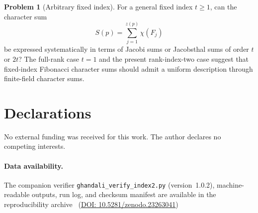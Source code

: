 \documentclass[11pt]{amsart}
\theoremstyle{plain}
\theoremstyle{definition}
\newtheorem{problem}[theorem]{Problem}
\begin{document}
\begin{problem}[Arbitrary fixed index]\label{prob:arbitrary-index}
For a general fixed index \(t\ge1\), can the character sum
\[
  S(p)=\sum_{j=1}^{z(p)}\chi(F_j)
\]
be expressed systematically in terms of Jacobi sums or Jacobsthal sums
of order \(t\) or \(2t\)?  The full-rank case \(t=1\) and the present
rank-index-two case suggest that fixed-index Fibonacci character sums
should admit a uniform description through finite-field character sums.
\end{problem}

\section*{Declarations}
\noindent
No external funding was received for this work.  The author declares no
competing interests.

\paragraph{Data availability.}
The companion verifier \texttt{ghandali\_verify\_index2.py} (version~1.0.2),
machine-readable outputs, run log, and checksum manifest are available in the
reproducibility archive~\cite{ghandaliIndex2Archive}
(\href{https://doi.org/10.5281/zenodo.23263041}{DOI: 10.5281/zenodo.23263041})





\end{document}
